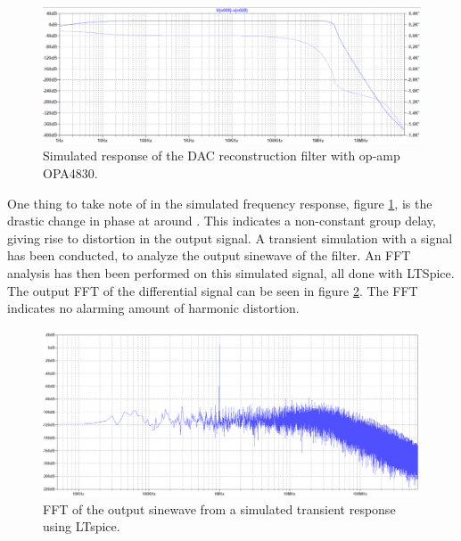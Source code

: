 \begin{figure}[H]
    \centering
    \includegraphics[clip, trim=0 0 0 0, width=1\textwidth]{Sections/7_SystemDesign/Figures/7_1_1_DAC_SIM_FILTER.pdf}
    \caption{Simulated response of the DAC reconstruction filter with op-amp OPA4830.}
    \label{fig_7_1_1_DAC_SIM_RESPONSE}
\end{figure}

One thing to take note of in the simulated frequency response, figure \ref{fig_7_1_1_DAC_SIM_RESPONSE}, is the drastic change in phase at around . This indicates a non-constant group delay, giving rise to distortion in the output signal. A transient simulation with a  signal has been conducted, to analyze the output sinewave of the filter. An FFT analysis has then been performed on this simulated signal, all done with LTSpice. The output FFT of the differential signal can be seen in figure \ref{fig_7_1_1_DAC_SIM_FFT}. The FFT indicates no alarming amount of harmonic distortion.

\begin{figure}[H]
    \centering
    \includegraphics[clip, trim=0 0 0 0, width=1\textwidth]{Sections/7_SystemDesign/Figures/7_1_1_DAC_SIM_FFT.pdf}
    \caption{FFT of the output  sinewave from a simulated transient response using LTspice.}
    \label{fig_7_1_1_DAC_SIM_FFT}
\end{figure}